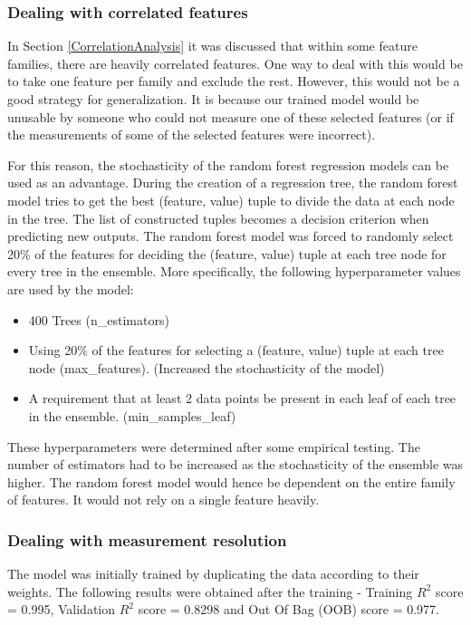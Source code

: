 \documentclass[11pt]{article}
\begin{document}
\subsubsection{Dealing with correlated features}
In Section \ref{CorrelationAnalysis} it was discussed that within some feature families, there are heavily correlated features.
One way to deal with this would be to take one feature per family and exclude the rest.
However, this would not be a good strategy for generalization.
It is because our trained model would be unusable by someone who could not measure one of these selected features (or if the measurements of some of the selected features were incorrect).

For this reason, the stochasticity of the random forest regression models can be used as an advantage.
During the creation of a regression tree,  the random forest model tries to get the best (feature,  value) tuple to divide the data at each node in the tree. The list of constructed tuples becomes a decision criterion when predicting new outputs.
The random forest model was forced to randomly select 20\% of the features for deciding the (feature, value) tuple at each tree node for every tree in the ensemble.
More specifically, the following hyperparameter values are used by the model:
\begin{itemize}
\item 400 Trees (n\_estimators)
\item Using 20\% of the features for selecting a (feature, value) tuple at each tree node (max\_features). (Increased the stochasticity of the model)
\item A requirement that at least 2 data points be present in each leaf of each tree in the ensemble.  (min\_samples\_leaf)
\end{itemize}
These hyperparameters were determined after some empirical testing.
The number of estimators had to be increased as the stochasticity of the ensemble was higher.
The random forest model would hence be dependent on the entire family of features. It would not rely on a single feature heavily.


\subsubsection{Dealing with measurement resolution}
The model was initially trained by duplicating the data according to their weights. 
The following results were obtained after the training - Training $R^2$ score = 0.995,  Validation $R^2$ score = 0.8298 and  Out Of Bag (OOB) score = 0.977.
\end{document}
